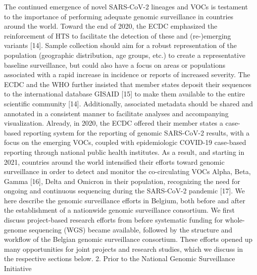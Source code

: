 The continued emergence of novel SARS-CoV-2 lineages and VOCs is testament to the importance of performing adequate genomic surveillance in countries around the world. Toward the end of 2020, the ECDC emphasized the reinforcement of HTS to facilitate the detection of these and (re-)emerging variants [14]. Sample collection should aim for a robust representation of the population (geographic distribution, age groups, etc.) to create a representative baseline surveillance, but could also have a focus on areas or populations associated with a rapid increase in incidence or reports of increased severity. The ECDC and the WHO further insisted that member states deposit their sequences to the international database GISAID [15] to make them available to the entire scientific community [14]. Additionally, associated metadata should be shared and annotated in a consistent manner to facilitate analyses and accompanying visualization. Already, in 2020, the ECDC offered their member states a case-based reporting system for the reporting of genomic SARS-CoV-2 results, with a focus on the emerging VOCs, coupled with epidemiologic COVID-19 case-based reporting through national public health institutes.
As a result, and starting in 2021, countries around the world intensified their efforts toward genomic surveillance in order to detect and monitor the co-circulating VOCs Alpha, Beta, Gamma [16], Delta and Omicron in their population, recognizing the need for ongoing and continuous sequencing during the SARS-CoV-2 pandemic [17]. We here describe the genomic surveillance efforts in Belgium, both before and after the establishment of a nationwide genomic surveillance consortium. We first discuss project-based research efforts from before systematic funding for whole-genome sequencing (WGS) became available, followed by the structure and workflow of the Belgian genomic surveillance consortium. These efforts opened up many opportunities for joint projects and research studies, which we discuss in the respective sections below.
2. Prior to the National Genomic Surveillance Initiative
